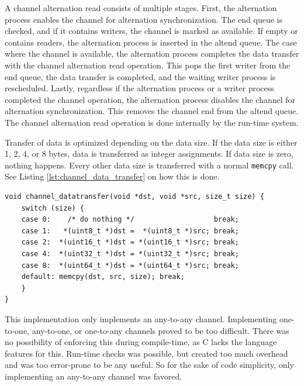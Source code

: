 A channel alternation read consists of multiple stages. First, the alternation process enables the channel for alternation synchronization. The end queue is checked, and if it contains writers, the channel is marked as available. If empty or contains readers, the alternation process is inserted in the altend queue. The case where the channel is available, the alternation process completes the data transfer with the channel alternation read operation. This pops the first writer from the end queue, the data transfer is completed, and the waiting writer process is rescheduled. Lastly, regardless if the alternation process or a writer process completed the channel operation, the alternation process disables the channel for alternation synchronization. This removes the channel end from the altend queue. The channel alternation read operation is done internally by the run\hyp{}time system.

Transfer of data is optimized depending on the data size. If the data size is either 1, 2, 4, or 8 bytes, data is transferred as integer assignments. If data size is zero, nothing happens. Every other data size is transferred with a normal \texttt{memcpy} call. See Listing \ref{lst:channel_data_transfer} on how this is done.

\noindent\begin{minipage}{\linewidth}
\begin{lstlisting}[caption={Channel data transfer},style={CustomC},label={lst:channel_data_transfer}]
void channel_datatransfer(void *dst, void *src, size_t size) {
    switch (size) {
    case 0:    /* do nothing */                   break;
    case 1:   *(uint8_t *)dst =  *(uint8_t *)src; break;
    case 2:  *(uint16_t *)dst = *(uint16_t *)src; break;
    case 4:  *(uint32_t *)dst = *(uint32_t *)src; break;
    case 8:  *(uint64_t *)dst = *(uint64_t *)src; break;
    default: memcpy(dst, src, size); break;
    }
}
\end{lstlisting}
\end{minipage}

This implementation only implements an any\hyp{}to\hyp{}any channel. Implementing one\hyp{}to\hyp{}one, any\hyp{}to\hyp{}one, or one\hyp{}to\hyp{}any channels proved to be too difficult. There was no possibility of enforcing this during compile\hyp{}time, as C lacks the language features for this. Run\hyp{}time checks was possible, but created too much overhead and was too error\hyp{}prone to be any useful. So for the sake of code simplicity, only implementing an any\hyp{}to\hyp{}any channel was favored. 


